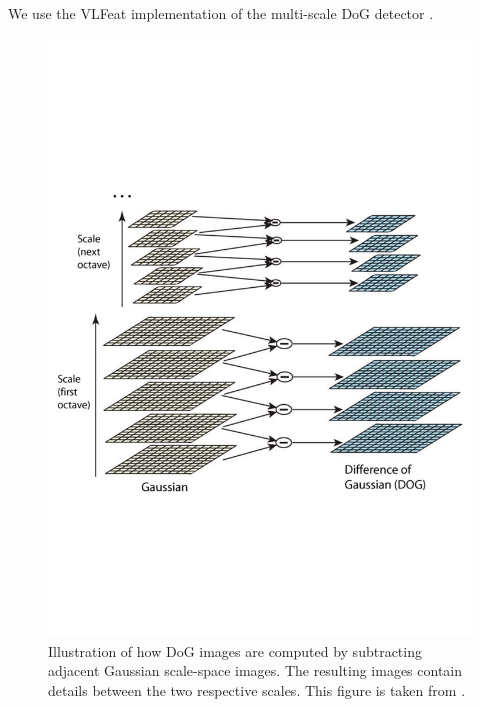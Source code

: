 \documentclass[thesis.tex]{subfiles}
\begin{document}
We use the VLFeat implementation of the multi-scale DoG detector  \citet{vedaldi2008vlfeat}.
%
\begin{figure}[p]
	\centering
	\includegraphics[width=\textwidth,clip=true,trim=0 200 0 220]{img/SIFT_dogspaces.pdf}
	\caption{Illustration of how DoG images are computed by subtracting adjacent Gaussian scale-space images. The resulting images contain details between the two respective scales. This figure is taken from \citet[figure 1,pp. 95]{lowe2004distinctive}.}
	\label{fig:dogSpaces}
	\vspace{5mm}


\end{figure}
\end{document}
